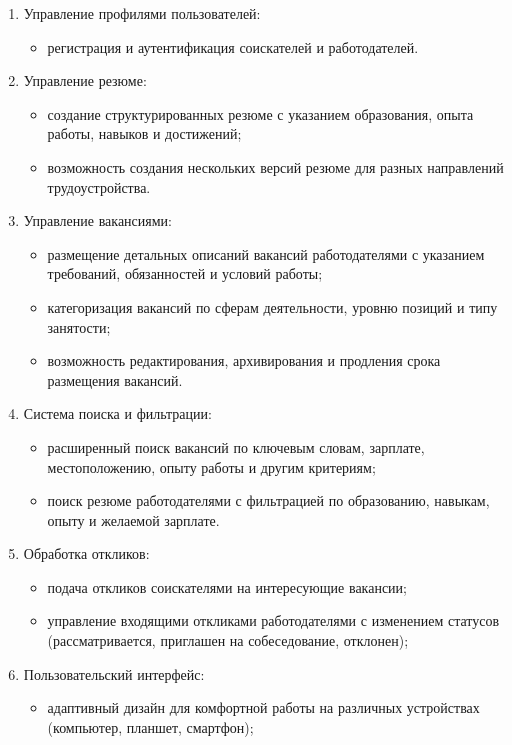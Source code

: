 \begin{enumerate}
	\item Управление профилями пользователей:
	\begin{itemize}
		\item регистрация и аутентификация соискателей и работодателей.
	\end{itemize}
	\item Управление резюме:
	\begin{itemize}
		\item создание структурированных резюме с указанием образования, опыта работы, навыков и достижений;
		\item возможность создания нескольких версий резюме для разных направлений трудоустройства.
	\end{itemize}
	\item Управление вакансиями:
	\begin{itemize}
		\item размещение детальных описаний вакансий работодателями с указанием требований, обязанностей и условий работы;
		\item категоризация вакансий по сферам деятельности, уровню позиций и типу занятости;
		\item возможность редактирования, архивирования и продления срока размещения вакансий.
	\end{itemize}
	\item Система поиска и фильтрации:
	\begin{itemize}
		\item  расширенный поиск вакансий по ключевым словам, зарплате, местоположению, опыту работы и другим критериям;
		\item поиск резюме работодателями с фильтрацией по образованию, навыкам, опыту и желаемой зарплате.
	\end{itemize}
	\item Обработка откликов:
	\begin{itemize}
		\item подача откликов соискателями на интересующие вакансии;
		\item управление входящими откликами работодателями с изменением статусов (рассматривается, приглашен на собеседование, отклонен);
	\end{itemize}
	\item Пользовательский интерфейс:
	\begin{itemize}
		\item адаптивный дизайн для комфортной работы на различных устройствах (компьютер, планшет, смартфон);

\end{itemize}
\end{enumerate}

